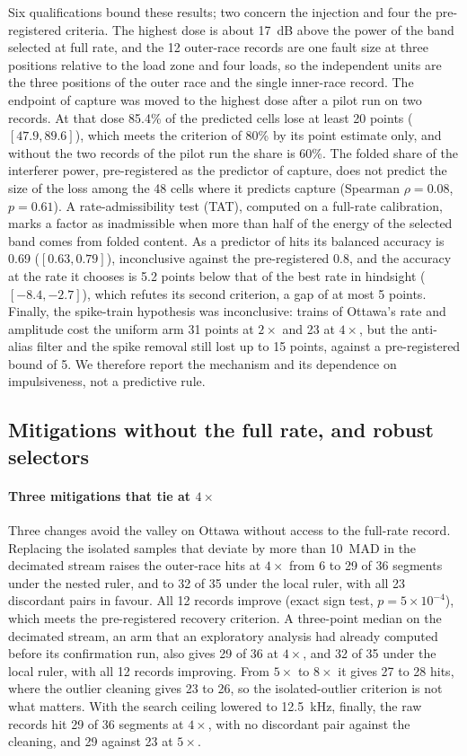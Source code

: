 Six qualifications bound these results; two concern the injection and four the pre-registered
criteria. The highest dose is about 17~dB above the power of the band selected at full rate, and the
12 outer-race records are one fault size at three positions relative to the load zone and four
loads, so the independent units are the three positions of the outer race and the single
inner-race record. The endpoint of capture was moved to the highest dose after a pilot run on two
records. At that dose 85.4\% of the predicted cells lose at least 20 points ($[47.9, 89.6]$), which
meets the criterion of 80\% by its point estimate only, and without the two records of the pilot
run the share is 60\%. The folded share of the interferer power, pre-registered as the predictor of
capture, does not predict the size of the loss among the 48 cells where it predicts capture
(Spearman $\rho = 0.08$, $p = 0.61$). A rate-admissibility test (TAT), computed on a full-rate
calibration, marks a factor as inadmissible when more than half of the energy of the selected band
comes from folded content. As a predictor of hits its balanced accuracy is 0.69 ($[0.63, 0.79]$),
inconclusive against the pre-registered 0.8, and the accuracy at the rate it chooses is 5.2 points
below that of the best rate in hindsight ($[-8.4, -2.7]$), which refutes its second criterion, a
gap of at most 5 points. Finally, the spike-train hypothesis was inconclusive: trains of Ottawa's
rate and amplitude cost the uniform arm 31 points at $2\times$ and 23 at $4\times$, but the
anti-alias filter and the spike removal still lost up to 15 points, against a pre-registered bound
of 5. We therefore report the mechanism and its dependence on impulsiveness, not a predictive rule.

\subsection{Mitigations without the full rate, and robust selectors}
\label{sec:res-mitig}

\paragraph{Three mitigations that tie at $4\times$} Three changes avoid the valley on Ottawa without
access to the full-rate record. Replacing the isolated samples that deviate by more than 10~MAD in
the decimated stream raises the outer-race hits at $4\times$ from 6 to 29 of 36 segments under the
nested ruler, and to 32 of 35 under the local ruler, with all 23 discordant pairs in favour. All 12
records improve (exact sign test, $p = 5\times10^{-4}$), which meets the pre-registered recovery
criterion. A three-point median on the decimated stream, an arm that an exploratory analysis had
already computed before its confirmation run, also gives 29 of 36 at $4\times$, and 32 of 35 under
the local ruler, with all 12 records improving. From $5\times$ to $8\times$ it gives 27 to 28 hits,
where the outlier cleaning gives 23 to 26, so the isolated-outlier criterion is not what matters.
With the search ceiling lowered to 12.5~kHz, finally, the raw records hit 29 of 36 segments at
$4\times$, with no discordant pair against the cleaning, and 29 against 23 at $5\times$.

